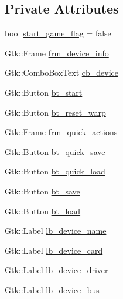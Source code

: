 \subsection*{Private Attributes}
\begin{DoxyCompactItemize}
\item 
bool \hyperlink{class_v_s_s_s___g_u_i_1_1_v4_l_interface_a864e480f734ddf62c070dd0f4593a484}{start\+\_\+game\+\_\+flag} = false
\item 
Gtk\+::\+Frame \hyperlink{class_v_s_s_s___g_u_i_1_1_v4_l_interface_acc87fe0a73e532e097a6fba14668950a}{frm\+\_\+device\+\_\+info}
\item 
Gtk\+::\+Combo\+Box\+Text \hyperlink{class_v_s_s_s___g_u_i_1_1_v4_l_interface_a9aebd92fe12b9b5acc25b1113dbd022e}{cb\+\_\+device}
\item 
Gtk\+::\+Button \hyperlink{class_v_s_s_s___g_u_i_1_1_v4_l_interface_a95958ffffbfb95a6a0fdefb2ffa6d3b9}{bt\+\_\+start}
\item 
Gtk\+::\+Button \hyperlink{class_v_s_s_s___g_u_i_1_1_v4_l_interface_af7e670a295f186a699859a285ea1cdbb}{bt\+\_\+reset\+\_\+warp}
\item 
Gtk\+::\+Frame \hyperlink{class_v_s_s_s___g_u_i_1_1_v4_l_interface_ae767dc7c9ab32b896d0eda294ece6dca}{frm\+\_\+quick\+\_\+actions}
\item 
Gtk\+::\+Button \hyperlink{class_v_s_s_s___g_u_i_1_1_v4_l_interface_a424118f056f71fba97d881f4647f7555}{bt\+\_\+quick\+\_\+save}
\item 
Gtk\+::\+Button \hyperlink{class_v_s_s_s___g_u_i_1_1_v4_l_interface_a7b72e731fab1a75270726fcd3936521e}{bt\+\_\+quick\+\_\+load}
\item 
Gtk\+::\+Button \hyperlink{class_v_s_s_s___g_u_i_1_1_v4_l_interface_a961db9f4decd0e940ebd69fbb0cccc61}{bt\+\_\+save}
\item 
Gtk\+::\+Button \hyperlink{class_v_s_s_s___g_u_i_1_1_v4_l_interface_a4c726d738e66bc77323a038918d133ce}{bt\+\_\+load}
\item 
Gtk\+::\+Label \hyperlink{class_v_s_s_s___g_u_i_1_1_v4_l_interface_a0001884d9b8cfde31da71445c1604c8a}{lb\+\_\+device\+\_\+name}
\item 
Gtk\+::\+Label \hyperlink{class_v_s_s_s___g_u_i_1_1_v4_l_interface_add0fb393e547f0ccaa23d6b29025efe4}{lb\+\_\+device\+\_\+card}
\item 
Gtk\+::\+Label \hyperlink{class_v_s_s_s___g_u_i_1_1_v4_l_interface_a7fe7bf3327c1f25e1c3b44f53e5c5a8f}{lb\+\_\+device\+\_\+driver}
\item 
Gtk\+::\+Label \hyperlink{class_v_s_s_s___g_u_i_1_1_v4_l_interface_a14d315a5613f2a10e2534c9090ca74c0}{lb\+\_\+device\+\_\+bus}

\end{DoxyCompactItemize}
